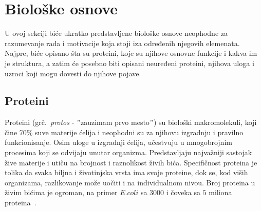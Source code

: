 \chapter{Biološke osnove} %
\label{bioloskeosnove} %

U ovoj sekciji biće ukratko predstavljene biološke osnove neophodne za razumevanje rada i motivacije koja stoji iza određenih njegovih elemenata.
Najpre, biće opisano šta su proteini, koje su njihove osnovne funkcije i kakva im je struktura, a zatim će posebno biti opisani neuređeni proteini, njihova uloga i uzroci koji mogu dovesti do njihove pojave. 

\section{Proteini}
\label{sec:proteini}

Proteini (grč.~{\em protos} - $"$zauzimam prvo mesto$"$) su biološki makromolekuli, koji čine 70\% suve materije ćelija i  neophodni su za njihovu izgradnju i pravilno funkcionisanje. Osim uloge u izgradnji ćelija, učestvuju u mnogobrojnim procesima koji se odvijaju unutar organizma. Predstavljaju najvažniji sastojak žive materije i utiču na brojnost i raznolikost živih bića. Specifičnost proteina je tolika da svaka biljna i životinjska vrsta ima svoje proteine, dok se, kod viših organizama, razlikovanje može uočiti i na individualnom nivou. Broj proteina u živim bićima je ogroman, na primer $E. coli$ sa $3000$ i čoveka sa $5$ miliona proteina~\cite{spasic, Principi}.\\

